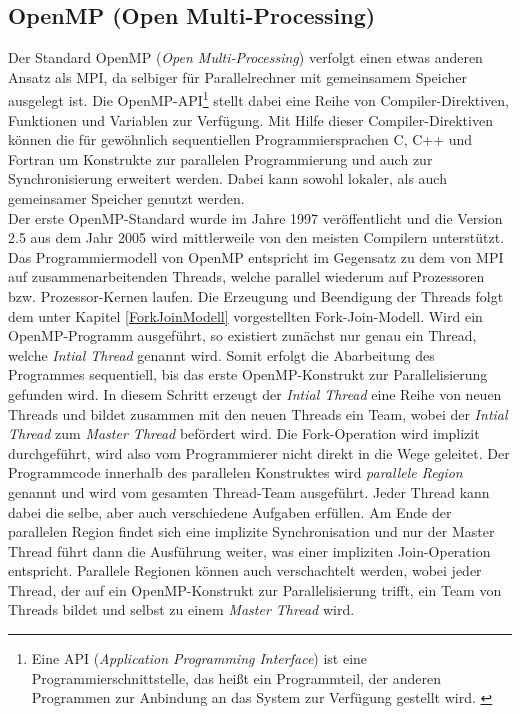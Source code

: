 		\subsection{OpenMP (Open Multi-Processing)}
			\label{OpenMP}
			
			Der Standard OpenMP (\textit{Open Multi-Processing}) verfolgt einen etwas anderen Ansatz als MPI, da selbiger für Parallelrechner mit gemeinsamem Speicher ausgelegt ist. Die OpenMP-API\footnote{Eine API (\textit{Application Programming Interface}) ist eine Programmierschnittstelle, das heißt ein Programmteil, der anderen Programmen zur Anbindung an das System zur Verfügung gestellt wird. \cite{APIWikipedia}} stellt dabei eine Reihe von Compiler-Direktiven, Funktionen und Variablen zur Verfügung. Mit Hilfe dieser Compiler-Direktiven können die für gewöhnlich sequentiellen Programmiersprachen C, C++ und Fortran um Konstrukte zur parallelen Programmierung und auch zur Synchronisierung erweitert werden. Dabei kann sowohl lokaler, als auch gemeinsamer Speicher genutzt werden.\\
			Der erste OpenMP-Standard wurde im Jahre 1997 veröffentlicht und die Version 2.5 aus dem Jahr 2005 wird mittlerweile von den meisten Compilern unterstützt.\\
			Das Programmiermodell von OpenMP entspricht im Gegensatz zu dem von MPI auf zusammenarbeitenden Threads, welche parallel wiederum auf Prozessoren bzw. Prozessor-Kernen laufen. Die Erzeugung und Beendigung der Threads folgt dem unter Kapitel \ref{ForkJoinModell} vorgestellten Fork-Join-Modell. Wird ein OpenMP-Programm ausgeführt, so existiert zunächst nur genau ein Thread, welche \textit{Intial Thread} genannt wird. Somit erfolgt die Abarbeitung des Programmes sequentiell, bis das erste OpenMP-Konstrukt zur Parallelisierung gefunden wird. In diesem Schritt erzeugt der \textit{Intial Thread} eine Reihe von neuen Threads und bildet zusammen mit den neuen Threads ein Team, wobei der \textit{Intial Thread} zum \textit{Master Thread} befördert wird. Die Fork-Operation wird implizit durchgeführt, wird also vom Programmierer nicht direkt in die Wege geleitet. Der Programmcode innerhalb des parallelen Konstruktes wird \textit{parallele Region} genannt und wird vom gesamten Thread-Team ausgeführt. Jeder Thread kann dabei die selbe, aber auch verschiedene Aufgaben erfüllen. Am Ende der parallelen Region findet sich eine implizite Synchronisation und nur der Master Thread führt dann die Ausführung weiter, was einer impliziten Join-Operation entspricht. Parallele Regionen können auch verschachtelt werden, wobei jeder Thread, der auf ein OpenMP-Konstrukt zur Parallelisierung trifft, ein Team von Threads bildet und selbst zu einem \textit{Master Thread} wird.\\
